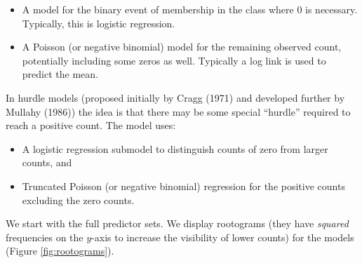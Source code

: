 \documentclass[10pt,]{scrartcl}
\begin{document}
\begin{itemize}
\item  A model for the binary event of membership in the class where 0 is necessary. Typically, this is logistic regression. 

\item  A Poisson (or negative binomial) model for the remaining observed count, potentially including some zeros as well. Typically a log link is used to predict the mean.
\end{itemize}

In hurdle models (proposed initially by Cragg (1971) and developed
further by Mullahy (1986)) the idea is that there may be some special
``hurdle'' required to reach a positive count. The model uses:

\begin{itemize}
\item A logistic regression  submodel to distinguish counts of zero from larger counts, and
\item  Truncated Poisson (or negative binomial) regression for the positive counts  excluding the zero counts.
\end{itemize}

We start with the full predictor sets. We display rootograms (they have
\emph{squared} frequencies on the \(y\)-axis to increase the visibility
of lower counts) for the models (Figure \ref{fig:rootograms}).

\footnotesize

\normalsize
\end{document}
